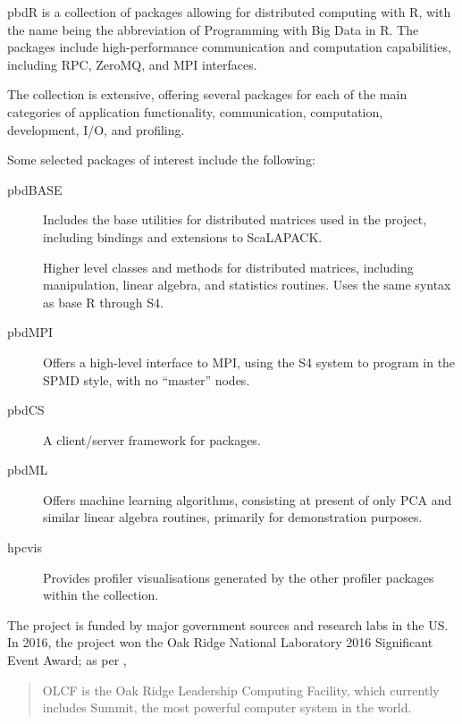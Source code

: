 pbdR is a collection of packages allowing for distributed computing with
R\cite{pbdBASEpackage}, with the name being the abbreviation of
Programming with Big Data in R. The packages include high-performance
communication and computation capabilities, including RPC, ZeroMQ, and
MPI interfaces.

The collection is extensive, offering several packages for each of the
main categories of application functionality, communication,
computation, development, I/O, and profiling.

Some selected packages of interest include the following:

\begin{description}

    \item[pbdBASE]
        Includes the base utilities for distributed matrices used in the
        project, including bindings and extensions to
        ScaLAPACK\cite{pbdBASEpackage}.
    \item[]
        Higher level classes and methods for distributed matrices, including
        manipulation, linear algebra, and statistics routines. Uses the same
        syntax as base R through S4\cite{pbdDMATpackage}.
    \item[pbdMPI]
        Offers a high-level interface to MPI, using the S4 system to program in
        the SPMD style, with no ``master'' nodes\cite{Chen2012pbdMPIpackage}.
    \item[pbdCS]
        A client/server framework for 
        packages\cite{Schmidt2015pbdCSpackage}.
    \item[pbdML]
        Offers machine learning algorithms, consisting at present of only PCA
        and similar linear algebra routines, primarily for demonstration
        purposes\cite{schmidt20}.
    \item[hpcvis]
        Provides profiler visualisations generated by the other profiler
        packages within the collection\cite{hpcvis}.
\end{description}

The project is funded by major government sources and research labs in
the US. In 2016, the project won the Oak Ridge National Laboratory 2016
Significant Event Award; as per \cite{pbdR2012},

\begin{quote}
    OLCF is the Oak Ridge Leadership Computing Facility, which currently
    includes Summit, the most powerful computer system in the world.
\end{quote}

